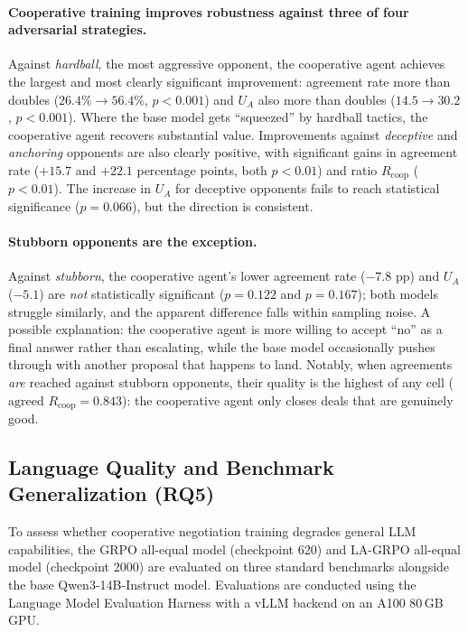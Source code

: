 \documentclass[12pt,a4paper]{article}
\begin{document}
\paragraph{Cooperative training improves robustness against three of four adversarial strategies.} Against \textit{hardball}, the most aggressive opponent, the cooperative agent achieves the largest and most clearly significant improvement: agreement rate more than doubles ($26.4\% \to 56.4\%$, $p < 0.001$) and $U_A$ also more than doubles ($14.5 \to 30.2$, $p < 0.001$). Where the base model gets ``squeezed'' by hardball tactics, the cooperative agent recovers substantial value. Improvements against \textit{deceptive} and \textit{anchoring} opponents are also clearly positive, with significant gains in agreement rate ($+15.7$ and $+22.1$ percentage points, both $p < 0.01$) and ratio $R_{\text{coop}}$ ($p < 0.01$). The increase in $U_A$ for deceptive opponents fails to reach statistical significance ($p = 0.066$), but the direction is consistent.

\paragraph{Stubborn opponents are the exception.} Against \textit{stubborn}, the cooperative agent's lower agreement rate ($-7.8$ pp) and $U_A$ ($-5.1$) are \emph{not} statistically significant ($p = 0.122$ and $p = 0.167$); both models struggle similarly, and the apparent difference falls within sampling noise. A possible explanation: the cooperative agent is more willing to accept ``no'' as a final answer rather than escalating, while the base model occasionally pushes through with another proposal that happens to land. Notably, when agreements \emph{are} reached against stubborn opponents, their quality is the highest of any cell ($\text{agreed } R_{\text{coop}} = 0.843$): the cooperative agent only closes deals that are genuinely good.


\subsection{Language Quality and Benchmark Generalization (RQ5)}

To assess whether cooperative negotiation training degrades general LLM capabilities, the GRPO all-equal model (checkpoint 620) and LA-GRPO all-equal model (checkpoint 2000) are evaluated on three standard benchmarks alongside the base Qwen3-14B-Instruct model. Evaluations are conducted using the Language Model Evaluation Harness with a vLLM backend on an A100 80\,GB GPU.
\end{document}
